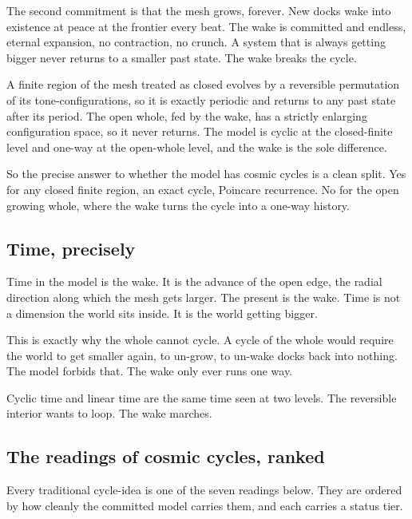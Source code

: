 The second commitment is that the mesh grows, forever. New docks wake into existence at peace at the frontier every beat. The wake is committed and endless, eternal expansion, no contraction, no crunch. A system that is always getting bigger never returns to a smaller past state. The wake breaks the cycle.

\begin{theorem}
A finite region of the mesh treated as closed evolves by a reversible permutation of its tone-configurations, so it is exactly periodic and returns to any past state after its period. The open whole, fed by the wake, has a strictly enlarging configuration space, so it never returns. The model is cyclic at the closed-finite level and one-way at the open-whole level, and the wake is the sole difference.
\end{theorem}

So the precise answer to whether the model has cosmic cycles is a clean split. Yes for any closed finite region, an exact cycle, Poincare recurrence. No for the open growing whole, where the wake turns the cycle into a one-way history.

\subsection{Time, precisely}

Time in the model is the wake. It is the advance of the open edge, the radial direction along which the mesh gets larger. The present is the wake. Time is not a dimension the world sits inside. It is the world getting bigger.

This is exactly why the whole cannot cycle. A cycle of the whole would require the world to get smaller again, to un-grow, to un-wake docks back into nothing. The model forbids that. The wake only ever runs one way.

\begin{principle}
Cyclic time and linear time are the same time seen at two levels. The reversible interior wants to loop. The wake marches.
\end{principle}

\subsection{The readings of cosmic cycles, ranked}

Every traditional cycle-idea is one of the seven readings below. They are ordered by how cleanly the committed model carries them, and each carries a status tier.

